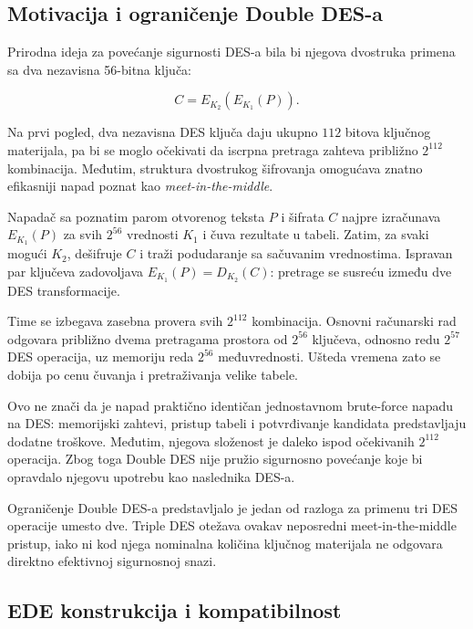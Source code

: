 \subsection{Motivacija i ograničenje Double DES-a}
\label{subsec:double_des}

Prirodna ideja za povećanje sigurnosti DES-a bila bi njegova dvostruka
primena sa dva nezavisna 56-bitna ključa:

\begin{equation}
    C = E_{K_2}\left(E_{K_1}(P)\right).
    \label{eq:double-des}
\end{equation}

Na prvi pogled, dva nezavisna DES ključa daju ukupno $112$ bitova
ključnog materijala, pa bi se moglo očekivati da iscrpna pretraga
zahteva približno $2^{112}$ kombinacija. Međutim, struktura dvostrukog
šifrovanja omogućava znatno efikasniji napad poznat kao
\emph{meet-in-the-middle}.

Napadač sa poznatim parom otvorenog teksta $P$ i šifrata $C$
najpre izračunava $E_{K_1}(P)$ za svih $2^{56}$ vrednosti $K_1$ i
čuva rezultate u tabeli. Zatim, za svaki mogući $K_2$, dešifruje $C$
i traži podudaranje sa sačuvanim vrednostima. Ispravan par ključeva
zadovoljava $E_{K_1}(P)=D_{K_2}(C)$: pretrage se susreću između dve
DES transformacije.

Time se izbegava zasebna provera svih $2^{112}$ kombinacija. Osnovni
računarski rad odgovara približno dvema pretragama prostora od
$2^{56}$ ključeva, odnosno redu $2^{57}$ DES operacija, uz memoriju
reda $2^{56}$ međuvrednosti. Ušteda vremena zato se dobija po cenu
čuvanja i pretraživanja velike tabele.

Ovo ne znači da je napad praktično identičan jednostavnom brute-force
napadu na DES: memorijski zahtevi, pristup tabeli i potvrđivanje kandidata
predstavljaju dodatne troškove. Međutim, njegova složenost je daleko
ispod očekivanih $2^{112}$ operacija. Zbog toga Double DES nije pružio
sigurnosno povećanje koje bi opravdalo njegovu upotrebu kao naslednika
DES-a.

Ograničenje Double DES-a predstavljalo je jedan od razloga za primenu
tri DES operacije umesto dve. Triple DES otežava ovakav neposredni
meet-in-the-middle pristup, iako ni kod njega nominalna količina
ključnog materijala ne odgovara direktno efektivnoj sigurnosnoj snazi.


\subsection{EDE konstrukcija i kompatibilnost}
\label{subsec:tdea_ede}

